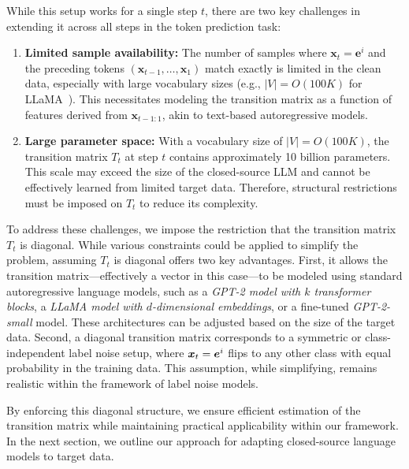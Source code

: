 While this setup works for a single step $t$, there are two key challenges in extending it across all steps in the token prediction task:

\begin{enumerate}[leftmargin=0.4cm]
    \item \textbf{Limited sample availability:} The number of samples where $\bm{x}_t = \bm{e}^i$ and the preceding tokens $(\bm{x}_{t-1}, \dots, \bm{x}_1)$ match exactly is limited in the clean data, especially with large vocabulary sizes (e.g., $|V| = O(100K)$ for LLaMA~\citep{dubey2024llama}). This necessitates modeling the transition matrix as a function of features derived from $\bm{x}_{t-1:1}$, akin to text-based autoregressive models.
    \item \textbf{Large parameter space:} With a vocabulary size of $|V| = O(100K)$, the transition matrix $T_t$ at step $t$ contains approximately 10 billion parameters. This scale may exceed the size of the closed-source LLM and cannot be effectively learned from limited target data. Therefore, structural restrictions must be imposed on $T_t$ to reduce its complexity.
\end{enumerate}

To address these challenges, we impose the restriction that the transition matrix $T_t$ is diagonal. While various constraints could be applied to simplify the problem, assuming $T_t$ is diagonal offers two key advantages. First, it allows the transition matrix—effectively a vector in this case—to be modeled using standard autoregressive language models, such as a \emph{GPT-2 model with $k$ transformer blocks}, a \emph{LLaMA model with $d$-dimensional embeddings}, or a fine-tuned \emph{GPT-2-small} model. These architectures can be adjusted based on the size of the target data. Second, a diagonal transition matrix corresponds to a symmetric or class-independent label noise setup, where $\bm{x}_t = \bm{e}^i$ flips to any other class with equal probability in the training data. This assumption, while simplifying, remains realistic within the framework of label noise models.

By enforcing this diagonal structure, we ensure efficient estimation of the transition matrix while maintaining practical applicability within our framework. In the next section, we outline our approach for adapting closed-source language models to target data.












